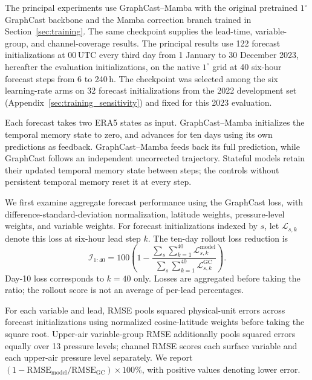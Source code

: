 \documentclass[11pt]{article}
\begin{document}
The principal experiments use GraphCast--Mamba with the original pretrained $1^\circ$ GraphCast backbone and the Mamba correction branch trained in Section~\ref{sec:training}. The same checkpoint supplies the lead-time, variable-group, and channel-coverage results. {The principal results use 122 forecast initializations at 00\,UTC every third day from 1 January to 30 December 2023, hereafter the evaluation initializations, on the native $1^\circ$ grid at 40 six-hour forecast steps from 6 to 240\,h.} {The checkpoint was selected among the six learning-rate arms on 32 forecast initializations from the 2022 development set (Appendix~\ref{sec:training_sensitivity}) and fixed for this 2023 evaluation.} 

Each forecast takes two ERA5 states as input. GraphCast--Mamba initializes the temporal memory state to zero, and advances for ten days using its own predictions as feedback. GraphCast--Mamba feeds back its full prediction, while GraphCast follows an independent uncorrected trajectory. Stateful models retain their updated temporal memory state between steps; the controls without persistent temporal memory reset it at every step.

We first examine aggregate forecast performance using the {GraphCast loss}, with difference-standard-deviation normalization, latitude weights, pressure-level weights, and variable weights. For forecast initializations indexed by $s$, let $\mathcal{L}_{s,k}$ denote this loss at six-hour lead step $k$. The ten-day rollout loss reduction is
\begin{equation}
    \mathcal{I}_{1:40}=100\left(1-
    \frac{\sum_s\sum_{k=1}^{40}\mathcal{L}^{\mathrm{model}}_{s,k}}
         {\sum_s\sum_{k=1}^{40}\mathcal{L}^{\mathrm{GC}}_{s,k}}\right).
    \label{eq:v3_loss_reduction}
\end{equation}
Day-10 loss corresponds to $k=40$ only. Losses are aggregated before taking the ratio; the rollout score is not an average of per-lead percentages.

For each variable and lead, RMSE pools squared physical-unit errors across forecast initializations using normalized cosine-latitude weights before taking the square root. Upper-air variable-group RMSE additionally pools squared errors equally over 13 pressure levels; channel RMSE scores each surface variable and each upper-air pressure level separately. We report $(1-\mathrm{RMSE}_{\mathrm{model}}/\mathrm{RMSE}_{\mathrm{GC}})\times 100\%$, with positive values denoting lower error.
\end{document}
